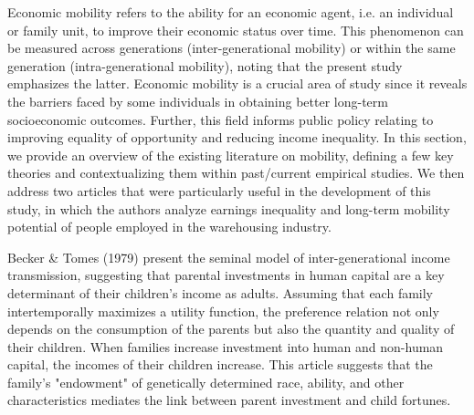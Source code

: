 \documentclass[11pt]{article}
\begin{document}
\begin{text}
\-\hspace{0.5cm} Economic mobility refers to the ability for an economic agent, i.e. an individual or family unit, to improve their economic status over time. This phenomenon can be measured across generations (inter-generational mobility) or within the same generation (intra-generational mobility), noting that the present study emphasizes the latter. Economic mobility is a crucial area of study since it reveals the barriers faced by some individuals in obtaining better long-term socioeconomic outcomes. Further, this field informs public policy relating to improving equality of opportunity and reducing income inequality. In this section, we provide an overview of the existing literature on mobility, defining a few key theories and contextualizing them within past/current empirical studies. We then address two articles that were particularly useful in the development of this study, in which the authors analyze earnings inequality and long-term mobility potential of people employed in the warehousing industry.

\-\hspace{0.5cm} Becker \& Tomes (1979) present the seminal model of inter-generational income transmission, suggesting that parental investments in human capital are a key determinant of their children's income as adults. Assuming that each family intertemporally maximizes a utility function,  the preference relation not only depends on the consumption of the parents but also the quantity and quality of their children. When families increase investment into human and non-human capital, the incomes of their children increase. This article suggests that the family's "endowment" of genetically determined race, ability, and other characteristics mediates the link between parent investment and child fortunes. 


\end{text}
\end{document}
